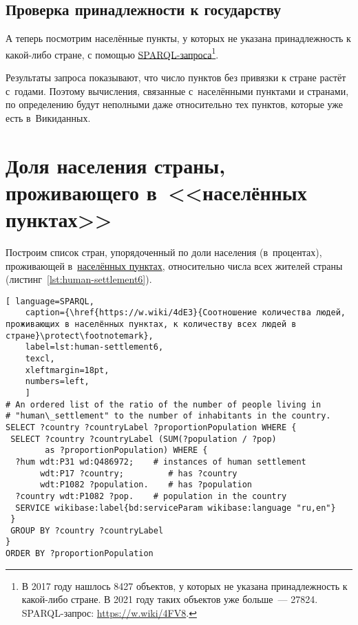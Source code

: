 \subsection{Проверка принадлежности к государству}

А теперь посмотрим населённые пункты, 
у которых не указана принадлежность к какой-либо стране, 
с помощью \href{https://w.wiki/4FV8}{SPARQL-запроса}\footnote{%
%
    В 2017 году нашлось \num{8427} объектов, у которых не указана принадлежность к какой-либо стране. 
    В 2021 году таких объектов уже больше~--- \num{27824}. SPARQL-запрос: \href{https://w.wiki/4FV8}{https://w.wiki/4FV8}.%
}. 

Результаты запроса показывают, что число пунктов без привязки к стране растёт с~годами. 
Поэтому вычисления, связанные с~населёнными пунктами и странами, 
по определению будут неполными даже относительно тех пунктов, которые уже есть в~Викиданных. 



\section{Доля населения страны, проживающего в~<<населённых пунктах>>}

Построим список стран, 
упорядоченный по доли населения (в~процентах), проживающей в~\href{http://www.wikidata.org/entity/Q486972}{населённых пунктах}, относительно числа всех жителей страны (листинг~\ref{lst:human-settlement6}).


\begin{lstlisting}[ language=SPARQL, 
    caption={\href{https://w.wiki/4dE3}{Соотношение количества людей, проживающих в населённых пунктах, к количеству всех людей в стране}\protect\footnotemark},
    label=lst:human-settlement6,
    texcl,
    xleftmargin=18pt, 
    numbers=left,
    ]
# An ordered list of the ratio of the number of people living in 
# "human\_settlement" to the number of inhabitants in the country.
SELECT ?country ?countryLabel ?proportionPopulation WHERE {
 SELECT ?country ?countryLabel (SUM(?population / ?pop) 
        as ?proportionPopulation) WHERE {
  ?hum wdt:P31 wd:Q486972;    # instances of human settlement  
       wdt:P17 ?country;         # has ?country 
       wdt:P1082 ?population.    # has ?population
  ?country wdt:P1082 ?pop.    # population in the country
  SERVICE wikibase:label{bd:serviceParam wikibase:language "ru,en"}
 }
 GROUP BY ?country ?countryLabel
}
ORDER BY ?proportionPopulation
\end{lstlisting}%


